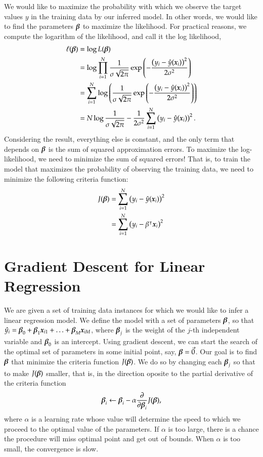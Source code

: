 \begin{refsection}
We would like to maximize the probability with which we observe the target values $y$ in the training data by our inferred model. In other words, we would like to find the parameters $\boldsymbol{\beta}$ to maximize the likelihood. For practical reasons, we compute the logarithm of the likelihood, and call it the log likelihood,
\begin{align}
\ell(\boldsymbol{\beta}) & = \log L(\boldsymbol{\beta}) \\
& = \log \prod_{i=1}^N {1\over\sigma\sqrt{2\pi}} \exp\left({-{\left(y_i-\hat{y}(\boldsymbol{x}_i)\right)^2\over 2\sigma^2}}\right) \\
& = \sum_{i=1}^N \log\left({1\over\sigma\sqrt{2\pi}} \exp\left({-{\left(y_i-\hat{y}(\boldsymbol{x}_i)\right)^2\over 2\sigma^2}}\right)\right) \\
& = N\log{1\over\sigma\sqrt{2\pi}} - {1\over 2\sigma^2}\sum_{i=1}^N\left(y_i-\hat{y}(\boldsymbol{x}_i)\right)^2.
\end{align}
Considering the result, everything else is constant, and the only term that depends on $\boldsymbol{\beta}$ is the sum of squared approximation errors. To maximize the log-likelihood, we need to minimize the sum of squared errors! That is, to train the model that maximizes the probability of observing the training data, we need to minimize the following criteria function:
\begin{align}
J(\boldsymbol{\beta}) & =\sum_{i=1}^N\left(y_i-\hat{y}(\boldsymbol{x}_i)\right)^2 \\
& = \sum_{i=1}^N\left(y_i-\beta^\intercal\boldsymbol{x}_i\right)^2
\end{align}

\section{Gradient Descent for Linear Regression}

We are given a set of training data instances for which we would like to infer a linear regression model. We define the model with a set of parameters $\boldsymbol{\beta}$, so that $\hat{y_i}=\boldsymbol{\beta}_0+\boldsymbol{\beta}_1\boldsymbol{x}_{i1}+\ldots+\boldsymbol{\beta}_M\boldsymbol{x}_{iM}$, where $\boldsymbol{\beta}_{j}$ is the weight of the $j$-th independent variable and $\boldsymbol{\beta}_0$ is an intercept. Using gradient descent, we can start the search of the optimal set of parameters in some initial point, say, 
$\boldsymbol{\beta}=\vec{0}$. Our goal is to find $\boldsymbol{\beta}$ that minimize the criteria function $J(\boldsymbol{\beta})$. We do so by changing each $\boldsymbol{\beta}_j$ so that to make $J(\boldsymbol{\beta})$ smaller, that is, in the direction oposite to the partial derivative of the criteria function
\begin{equation}
  \boldsymbol{\beta}_i\leftarrow\boldsymbol{\beta}_i-\alpha{\partial\over\partial\boldsymbol{\beta}_i}J(\boldsymbol{\beta}),
\end{equation}
%
where $\alpha$ is a learning rate whose value will determine the speed to which we proceed to the optimal value of the parameters. If $\alpha$ is too large, there is a chance the procedure will miss optimal point and get out of bounds. When $\alpha$ is too small, the convergence is slow.


\end{refsection}
